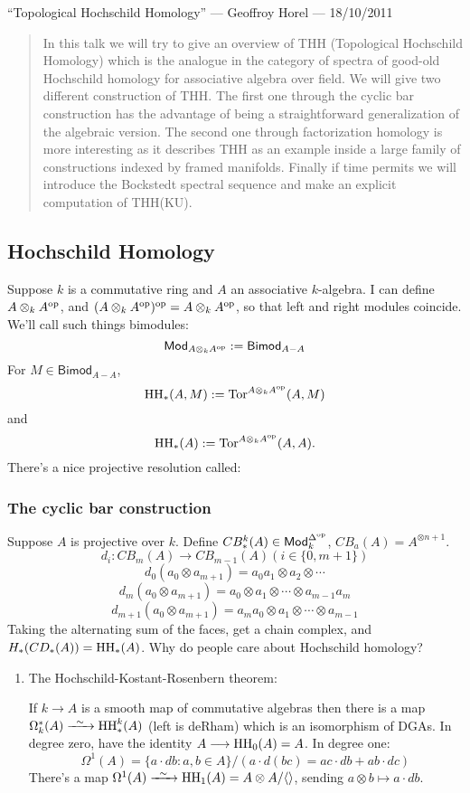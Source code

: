 \begin{GeoffroyTopologicalHochschildHomology}
\newcommand{\THH}{\textup{THH}}
\newcommand{\HH}{\textup{HH}}
\KanSemResponse
{``Topological Hochschild Homology'' --- Geoffroy Horel --- 18/10/2011}
\begin{abstract}
In this talk we will try to give an overview of THH
(Topological Hochschild Homology) which is the analogue in the category of
spectra of good-old Hochschild homology for associative algebra over field.
We will give two different construction of THH. The first one through the
cyclic bar construction has the advantage of being a straightforward
generalization of the algebraic version. The second one through
factorization homology is more interesting as it describes THH as an
example inside a large family of constructions indexed by framed manifolds.
Finally if time permits we will introduce the Bockstedt spectral sequence
and make an explicit computation of THH(KU).
\end{abstract}
\subsection*{Hochschild Homology}
Suppose $k$ is a commutative ring and $A$ an associative $k$-algebra. I can define $A\otimes_k A^{\textup{op}}$, and $(A\otimes_k A^{\textup{op}})^{\textup{op}}=A\otimes_k A^{\textup{op}}$, so that left and right modules coincide. We'll call such things bimodules:
\[\mathsf{Mod}_{A\otimes_k A^{\textup{op}}}:=\mathsf{Bimod}_{A-A}\]
For $M\in \mathsf{Bimod}_{A-A}$, 
\[\HH_*(A,M):=\Tor^{A\otimes_k A^\op}(A,M)\]
and 
\[\HH_*(A):=\Tor^{A\otimes_k A^\op}(A,A).\]
There's a nice projective resolution called:
\subsubsection*{The cyclic bar construction}
Suppose $A$ is projective over $k$. Define $CB_*^k(A)\in \mathsf{Mod}_k^{\Delta^{\textup{op}}}$, $CB_a(A)=A^{\otimes n+1}$.
\[d_i:CB_m(A)\to CB_{m-1}(A) (i\in\{0,m+1\})\]
\[d_0(a_0\otimes a_{m+1})=a_0a_1\otimes a_2\otimes\cdots\]
\[d_m(a_0\otimes a_{m+1})=a_0\otimes a_1\otimes\cdots\otimes a_{m-1}a_{m}\]
\[d_{m+1}(a_0\otimes a_{m+1})=a_ma_0\otimes a_1\otimes\cdots\otimes a_{m-1}\]
Taking the alternating sum of the faces, get a chain complex, and
$H_*(CD_*(A))=\HH_*(A)$.
Why do people care about Hochschild homology?
\begin{enumerate}
\item The Hochschild-Kostant-Rosenbern theorem:
\begin{thm*}
If $k\to A$ is a smooth map of commutative algebras then there is a map $\Omega_k^*(A)\weakequiv \HH_*^k(A)$ (left is deRham) which is an isomorphism of DGAs. In degree zero, have the identity $A\to\HH_0(A)=A$. In degree one:
\[\Omega^1(A)=\{a\cdot db:a,b\in A\}/(a\cdot d(bc)=ac\cdot db+ab\cdot dc)\]
There's a map $\Omega^1(A)\weakequiv\HH_1(A)=A\otimes A/\langle\rangle$, sending $a\otimes b\mapsto a\cdot db$.


\end{thm*}
\end{enumerate}
\end{GeoffroyTopologicalHochschildHomology}
